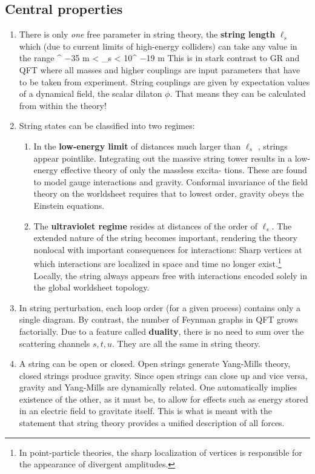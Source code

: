 \subsection{Central properties}
\label{subsec:stringProperties}
\begin{enumerate}
	\item There is only \emph{one} free parameter in string theory, the \textbf{string length} $\ell_s$ which (due to current limits
	of high-energy colliders) can take any value in the range
	\bse 
	^{ −35} m < \ell_s < 10^{ −19} m
	\quad {}
	\ese 
	This is in stark contrast to GR and QFT where all masses and higher couplings are input parameters
	that have to be taken from experiment. String couplings are given by expectation values of a
	dynamical field, the scalar dilaton $\phi$. That means they can be calculated from within the theory!
	\item String states can be classified into two regimes:
	\begin{enumerate}
	\item  In the \textbf{low-energy limit} of distances much larger than $\ell_s$ , strings appear pointlike. Integrating
	out the massive string tower results in a low-energy effective theory of only the massless excita-
	tions. These are found to model gauge interactions and gravity. Conformal invariance of the field
	theory on the worldsheet requires that to lowest order, gravity obeys the Einstein equations.
	\item  The \textbf{ultraviolet regime} resides at distances of the order of $\ell_s$. The extended nature of the string
	becomes important, rendering the theory nonlocal with important consequences for interactions:
	Sharp vertices at which interactions are localized in space and time no longer exist.\footnote{In point-particle theories, the sharp localization of vertices is responsible for the appearance of divergent amplitudes.} Locally, the
	string always appears free with interactions encoded solely in the global worldsheet topology.
\end{enumerate}
	\item In string perturbation, each loop order (for a given process) contains only a single diagram. By
	contrast, the number of Feynman graphs in QFT grows factorially. Due to a feature called \textbf{duality},
	there is no need to sum over the scattering channels $s, t, u$. They are all the same in string theory.
	\item A string can be open or closed. Open strings generate Yang-Mills theory, closed strings produce
	gravity. Since open strings can close up and vice versa, gravity and Yang-Mills are dynamically
	related. One automatically implies existence of the other, as it must be, to allow for effects such as
	energy stored in an electric field to gravitate itself. This is what is meant with the statement that
	string theory provides a unified description of all forces.
\end{enumerate}


